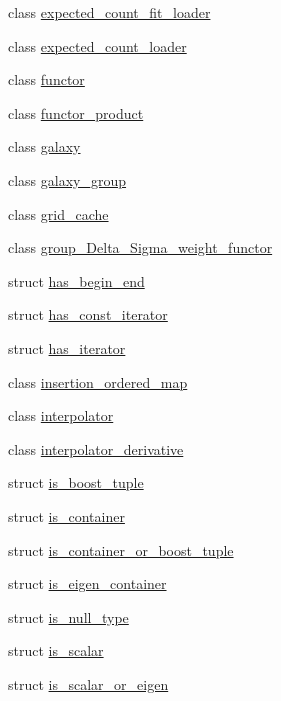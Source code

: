 \begin{DoxyCompactItemize}
\item 
class \hyperlink{classIceBRG_1_1expected__count__fit__loader}{expected\+\_\+count\+\_\+fit\+\_\+loader}
\item 
class \hyperlink{classIceBRG_1_1expected__count__loader}{expected\+\_\+count\+\_\+loader}
\item 
class \hyperlink{classIceBRG_1_1functor}{functor}
\item 
class \hyperlink{classIceBRG_1_1functor__product}{functor\+\_\+product}
\item 
class \hyperlink{classIceBRG_1_1galaxy}{galaxy}
\item 
class \hyperlink{classIceBRG_1_1galaxy__group}{galaxy\+\_\+group}
\item 
class \hyperlink{classIceBRG_1_1grid__cache}{grid\+\_\+cache}
\item 
class \hyperlink{classIceBRG_1_1group__Delta__Sigma__weight__functor}{group\+\_\+\+Delta\+\_\+\+Sigma\+\_\+weight\+\_\+functor}
\item 
struct \hyperlink{structIceBRG_1_1has__begin__end}{has\+\_\+begin\+\_\+end}
\item 
struct \hyperlink{structIceBRG_1_1has__const__iterator}{has\+\_\+const\+\_\+iterator}
\item 
struct \hyperlink{structIceBRG_1_1has__iterator}{has\+\_\+iterator}
\item 
class \hyperlink{classIceBRG_1_1insertion__ordered__map}{insertion\+\_\+ordered\+\_\+map}
\item 
class \hyperlink{classIceBRG_1_1interpolator}{interpolator}
\item 
class \hyperlink{classIceBRG_1_1interpolator__derivative}{interpolator\+\_\+derivative}
\item 
struct \hyperlink{structIceBRG_1_1is__boost__tuple}{is\+\_\+boost\+\_\+tuple}
\item 
struct \hyperlink{structIceBRG_1_1is__container}{is\+\_\+container}
\item 
struct \hyperlink{structIceBRG_1_1is__container__or__boost__tuple}{is\+\_\+container\+\_\+or\+\_\+boost\+\_\+tuple}
\item 
struct \hyperlink{structIceBRG_1_1is__eigen__container}{is\+\_\+eigen\+\_\+container}
\item 
struct \hyperlink{structIceBRG_1_1is__null__type}{is\+\_\+null\+\_\+type}
\item 
struct \hyperlink{structIceBRG_1_1is__scalar}{is\+\_\+scalar}
\item 
struct \hyperlink{structIceBRG_1_1is__scalar__or__eigen}{is\+\_\+scalar\+\_\+or\+\_\+eigen}

\end{DoxyCompactItemize}

